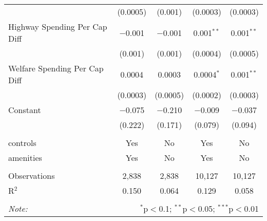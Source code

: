 \begin{table}[!htbp]
\begin{tabular}{@{\extracolsep{5pt}}lcccc}
  & (0.0005) & (0.001) & (0.0003) & (0.0003) \\ 
  Highway Spending Per Cap Diff & $-$0.001 & $-$0.001 & 0.001$^{**}$ & 0.001$^{**}$ \\ 
  & (0.001) & (0.001) & (0.0004) & (0.0005) \\ 
  Welfare Spending Per Cap Diff & 0.0004 & 0.0003 & 0.0004$^{*}$ & 0.001$^{**}$ \\ 
  & (0.0003) & (0.0005) & (0.0002) & (0.0003) \\ 
  Constant & $-$0.075 & $-$0.210 & $-$0.009 & $-$0.037 \\ 
  & (0.222) & (0.171) & (0.079) & (0.094) \\ 
 \hline \\[-1.8ex] 
controls & Yes & No & Yes & No \\ 
amenities & Yes & No & Yes & No \\ 
\hline \\[-1.8ex] 
Observations & 2,838 & 2,838 & 10,127 & 10,127 \\ 
R$^{2}$ & 0.150 & 0.064 & 0.129 & 0.058 \\ 
\hline 
\hline \\[-1.8ex] 
\textit{Note:}  & \multicolumn{4}{r}{$^{*}$p$<$0.1; $^{**}$p$<$0.05; $^{***}$p$<$0.01} \\ 
\end{tabular} 
\end{table} 
